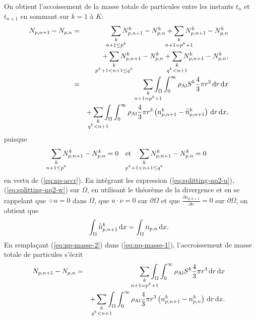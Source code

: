 On obtient l'accoissement de la masse totale de particules entre les
instants $t_n$ et $t_{n+1}$ en sommant sur $k = 1$ à $K$:
\begin{eqnarray}
  N_{p,n+1} - N_{p,n}
  &=& \sum_{\mathclap{\substack{k\\ n+1 \leq p^k}}} N_{p,n+1}^k - N_{p,n}^k %
  + \sum_{\mathclap{\substack{k\\ n+1 = p^k + 1}}} N_{p,n+1}^k - N_{p,n}^k \nonumber\\
  && + \sum_{\mathclap{\substack{k\\ p^k + 1 < n+1 \leq q^k}}} N_{p,n+1}^k - N_{p,n}^k %
  + \sum_{\mathclap{\substack{k\\ q^k < n+1}}} N_{p,n+1}^k - N_{p,n}^k,\nonumber\\
  &=&\sum_{\mathclap{\substack{k\\ n+1 = p^k+1}}} \displaystyle\int_\Omega\displaystyle\int_0^\infty \aluminadensity S^k\frac{4}{3}\pi
  r^3\intd{r}\intd{x} \nonumber\\
  && + \sum_{\mathclap{\substack{k \\ q^k < n+1}}} \displaystyle\int_\Omega\displaystyle\int_0^\infty \aluminadensity \frac{4}{3}\pi
    r^3\parent{n_{p,n+1}^k - \bar{\bar n}_{p,n+1}^k}\intd{r}\intd{x}, \label{eq:np-masse-1}
\end{eqnarray}
puisque
\begin{equation*}
\sum_{\mathclap{\substack{k\\ n+1 \leq p^k}}} N_{p,n+1}^k - N_{p,n}^k = 0 \quad \text{et}\quad \sum_{\mathclap{\substack{k\\ p^k + 1 < n+1 \leq q^k}}} N_{p,n+1}^k - N_{p,n}^k = 0
\end{equation*}
en vertu de (\ref{eq:np-accr}). En intégrant les expression (\ref{eq:splitting-np2-u}),
(\ref{eq:splitting-np2-w}) sur $\Omega$, en utilisant le théorème
de la divergence et en se rappelant que $\div u = 0$ dans $\Omega$,
que $u\cdot\nu = 0$ sur $\partial \Omega$ et que $\frac{\partial
  n_{p,n+1}}{\partial \nu} = 0$ sur $\partial \Omega$, on obtient que
\begin{equation}\label{eq:np-masse-2}
  \int_\Omega \bar{\bar n}_{p,n+1}^k\,\mathrm dx = \int_\Omega n_{p,n}\,\mathrm dx.
\end{equation}
En remplaçant (\ref{eq:np-masse-2}) dans (\ref{eq:np-masse-1}),
l'accroissement de masse totale de particules s'écrit
\begin{eqnarray}\label{eq:np-masse-3}
  N_{p,n+1} - N_{p,n} &=&\sum_{\mathclap{\substack{k\\ n+1 = p^k+1}}} \displaystyle\int_\Omega\displaystyle\int_0^\infty \aluminadensity S^k\frac{4}{3}\pi
  r^3\intd{r}\intd{x} \nonumber\\
  && + \sum_{\mathclap{\substack{k \\ q^k < n+1}}} \displaystyle\int_\Omega\displaystyle\int_0^\infty \aluminadensity \frac{4}{3}\pi
    r^3\parent{n_{p,n+1}^k - n_{p,n}^k}\intd{r}\intd{x}.
\end{eqnarray}

